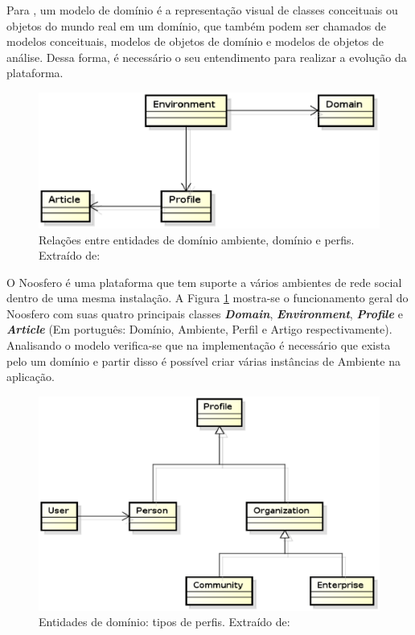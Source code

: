 Para , um modelo de domínio é a representação visual de classes conceituais ou objetos do mundo real em um domínio, que também podem ser chamados de modelos conceituais, modelos de objetos de domínio e modelos de objetos de análise. Dessa forma, é necessário o seu entendimento para realizar a evolução da plataforma.

\begin{figure}[h]
    \centering
    \includegraphics[keepaspectratio=true,scale=0.65]
      {figuras/domain_main.eps}
    \caption{Relações entre entidades de domínio ambiente, domínio e perfis. Extraído de: \cite{bucher2013rede}}
    \label{domain_main}
\end{figure}

O Noosfero é uma plataforma que tem suporte a vários ambientes de rede social dentro de uma mesma instalação. A Figura \ref{domain_main} mostra-se o funcionamento geral do Noosfero com suas quatro principais classes \textbf{\textit{Domain}}, \textbf{\textit{Environment}}, \textbf{\textit{Profile}} e \textbf{\textit{Article}} (Em português: Domínio, Ambiente, Perfil e Artigo respectivamente). Analisando o modelo verifica-se que na implementação é necessário que exista pelo um domínio e partir disso é possível criar várias instâncias de Ambiente na aplicação.

\begin{figure}[h]
    \centering
    \includegraphics[keepaspectratio=true,scale=0.6]
      {figuras/domain_profiles.eps}
    \caption{Entidades de domínio: tipos de perfis. Extraído de: \cite{bucher2013rede}}
    \label{domain_profiles}
\end{figure}

